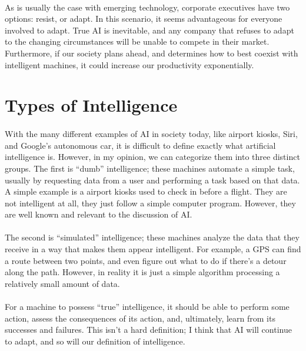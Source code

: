 \documentclass{article}
\begin{document}
    \paragraph{}
      As is usually the case with emerging technology, corporate executives have
      two options: resist, or adapt. In this scenario, it seems advantageous for
      everyone involved to adapt. True AI is inevitable, and any company that
      refuses to adapt to the changing circumstances will be unable to compete
      in their market. Furthermore, if our society plans ahead, and determines
      how to best coexist with intelligent machines, it could increase our
      productivity exponentially.

  \section{Types of Intelligence}

    \paragraph{}
      With the many different examples of AI in society today, like airport kiosks,
      Siri, and Google's autonomous car, it is difficult to define exactly what
      artificial intelligence is. However, in my opinion, we can categorize them
      into three distinct groups. The first is ``dumb''
      intelligence; these machines automate a simple task, usually by requesting
      data from a user and performing a task based on that data. A simple example
      is a airport kiosks used to check in before a flight. They are not intelligent at all,
      they just follow a simple computer program. However, they are well known
      and relevant to the discussion of AI.

    \paragraph{}
      The second is ``simulated'' intelligence;
      these machines analyze the data that they receive in a way that makes them
      appear intelligent.
      For example, a GPS can find a route between two points, and even figure out what
      to do if there's a detour along the path. However, in reality it is just a
      simple algorithm processing a relatively small amount of data.

    \paragraph{}
      For a machine to possess ``true'' intelligence, it should be able to perform some action,
      assess the consequences of its action, and, ultimately, learn from its
      successes and failures. This isn't a hard definition; I think that
      AI will continue to adapt, and so will our definition of intelligence.
\end{document}
